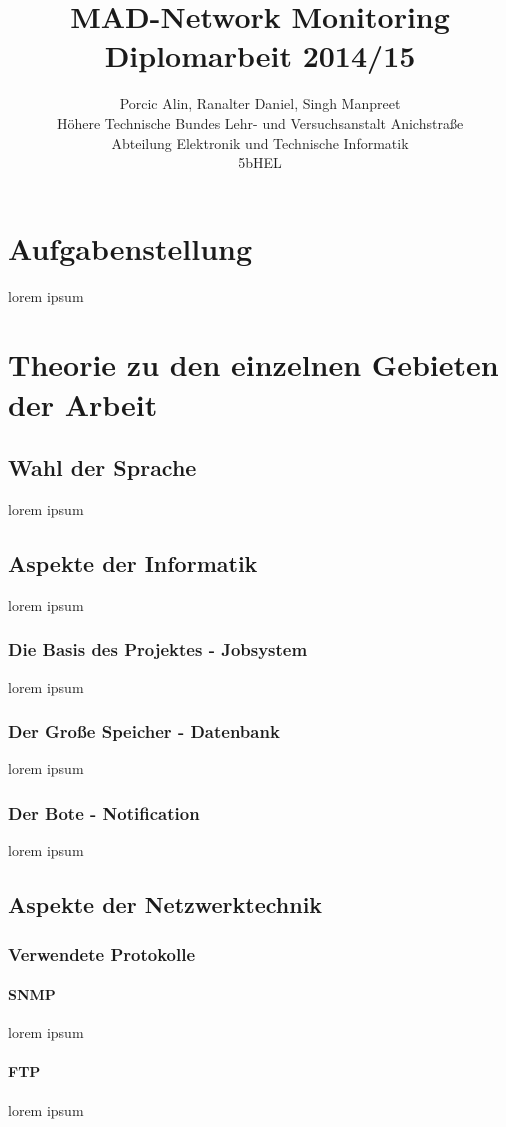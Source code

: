 \documentclass[10pt,a4paper,titlepage]{article}
\title{MAD-Network Monitoring\\
Diplomarbeit 2014/15}
\author{Porcic Alin, Ranalter Daniel, Singh Manpreet\\
Höhere Technische Bundes Lehr- und Versuchsanstalt Anichstraße\\
Abteilung Elektronik und Technische Informatik\\
5bHEL}
\begin{document}
\maketitle
\begin{abstract}

\end{abstract}
\tableofcontents
\newpage
\section{Aufgabenstellung}
lorem ipsum
\section{Theorie zu den einzelnen Gebieten der Arbeit}
\subsection{Wahl der Sprache}
lorem ipsum
\subsection{Aspekte der Informatik}
lorem ipsum
\subsubsection{Die Basis des Projektes - Jobsystem}
lorem ipsum
\subsubsection{Der Große Speicher - Datenbank}
lorem ipsum
\subsubsection{Der Bote - Notification}
lorem ipsum
\subsection{Aspekte der Netzwerktechnik}
\subsubsection{Verwendete Protokolle}
\paragraph{SNMP}
lorem ipsum
\paragraph{FTP}
lorem ipsum
\end{document}
